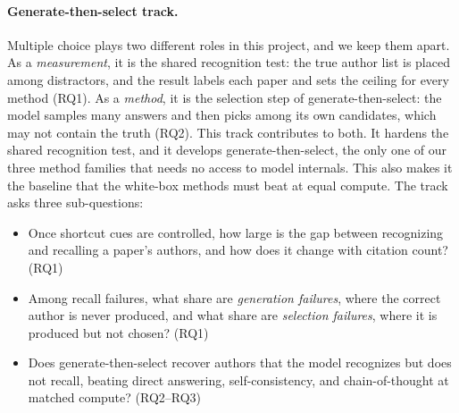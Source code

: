

\paragraph{Generate-then-select track.}
Multiple choice plays two different roles in this project, and we keep them apart. As a \emph{measurement}, it is the shared recognition test: the true author list is placed among distractors, and the result labels each paper and sets the ceiling for every method (RQ1). As a \emph{method}, it is the selection step of generate-then-select: the model samples many answers and then picks among its own candidates, which may not contain the truth (RQ2). This track contributes to both. It hardens the shared recognition test, and it develops generate-then-select, the only one of our three method families that needs no access to model internals. This also makes it the baseline that the white-box methods must beat at equal compute. The track asks three sub-questions:
\begin{itemize}
\item Once shortcut cues are controlled, how large is the gap between recognizing and recalling a paper's authors, and how does it change with citation count? (RQ1)
\item Among recall failures, what share are \emph{generation failures}, where the correct author is never produced, and what share are \emph{selection failures}, where it is produced but not chosen? (RQ1)
\item Does generate-then-select recover authors that the model recognizes but does not recall, beating direct answering, self-consistency, and chain-of-thought at matched compute? (RQ2--RQ3)
\end{itemize}


